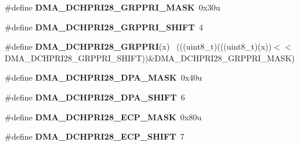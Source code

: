 \begin{DoxyCompactItemize}
\item 
\hypertarget{group___d_m_a___register___masks_ga0d071247a9d5efd0a2e4309af0668cd7}{}\#define {\bfseries D\+M\+A\+\_\+\+D\+C\+H\+P\+R\+I28\+\_\+\+G\+R\+P\+P\+R\+I\+\_\+\+M\+A\+S\+K}~0x30u\label{group___d_m_a___register___masks_ga0d071247a9d5efd0a2e4309af0668cd7}

\item 
\hypertarget{group___d_m_a___register___masks_gad3e2a3073d2f8a6c8f1bad55620f362f}{}\#define {\bfseries D\+M\+A\+\_\+\+D\+C\+H\+P\+R\+I28\+\_\+\+G\+R\+P\+P\+R\+I\+\_\+\+S\+H\+I\+F\+T}~4\label{group___d_m_a___register___masks_gad3e2a3073d2f8a6c8f1bad55620f362f}

\item 
\hypertarget{group___d_m_a___register___masks_ga21e659577448e7343ae534d4a0a9571c}{}\#define {\bfseries D\+M\+A\+\_\+\+D\+C\+H\+P\+R\+I28\+\_\+\+G\+R\+P\+P\+R\+I}(x)                                  ~(((uint8\+\_\+t)(((uint8\+\_\+t)(x))$<$$<$D\+M\+A\+\_\+\+D\+C\+H\+P\+R\+I28\+\_\+\+G\+R\+P\+P\+R\+I\+\_\+\+S\+H\+I\+F\+T))\&D\+M\+A\+\_\+\+D\+C\+H\+P\+R\+I28\+\_\+\+G\+R\+P\+P\+R\+I\+\_\+\+M\+A\+S\+K)\label{group___d_m_a___register___masks_ga21e659577448e7343ae534d4a0a9571c}

\item 
\hypertarget{group___d_m_a___register___masks_ga85efa389a66661ef393bdee9ff124046}{}\#define {\bfseries D\+M\+A\+\_\+\+D\+C\+H\+P\+R\+I28\+\_\+\+D\+P\+A\+\_\+\+M\+A\+S\+K}~0x40u\label{group___d_m_a___register___masks_ga85efa389a66661ef393bdee9ff124046}

\item 
\hypertarget{group___d_m_a___register___masks_ga939d68abba7c7cbb67fda55c45eaed43}{}\#define {\bfseries D\+M\+A\+\_\+\+D\+C\+H\+P\+R\+I28\+\_\+\+D\+P\+A\+\_\+\+S\+H\+I\+F\+T}~6\label{group___d_m_a___register___masks_ga939d68abba7c7cbb67fda55c45eaed43}

\item 
\hypertarget{group___d_m_a___register___masks_ga7bbf116152cd0b12cb2aa09c177f3efb}{}\#define {\bfseries D\+M\+A\+\_\+\+D\+C\+H\+P\+R\+I28\+\_\+\+E\+C\+P\+\_\+\+M\+A\+S\+K}~0x80u\label{group___d_m_a___register___masks_ga7bbf116152cd0b12cb2aa09c177f3efb}

\item 
\hypertarget{group___d_m_a___register___masks_ga3558f81ad5e6803ae39f6e0fe11f2b32}{}\#define {\bfseries D\+M\+A\+\_\+\+D\+C\+H\+P\+R\+I28\+\_\+\+E\+C\+P\+\_\+\+S\+H\+I\+F\+T}~7\label{group___d_m_a___register___masks_ga3558f81ad5e6803ae39f6e0fe11f2b32}


\end{DoxyCompactItemize}
